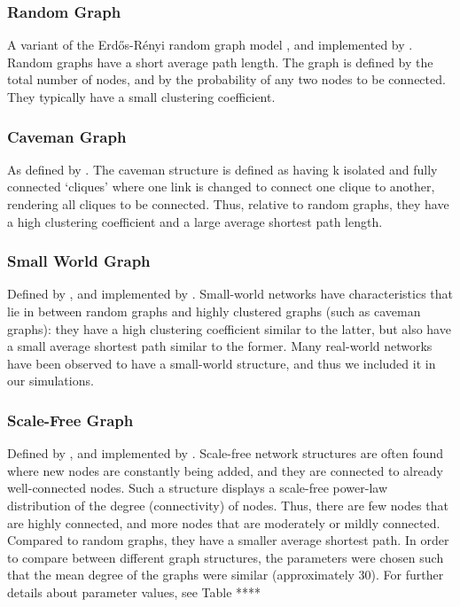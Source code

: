 \subsubsection{Random Graph}

A variant of the Erd\H{o}s-R\'enyi random graph model \citep*{ER1960}, and implemented by \citet*{BS2011}.
Random graphs have a short average path length. The graph is defined by the total number of nodes, and by the probability of any two nodes to be connected. They typically have a small clustering coefficient.

\subsubsection{Caveman Graph}

As defined by \citet*{W2003}.
The caveman structure is defined as having k isolated and fully connected `cliques' where one link is changed to connect one clique to another, rendering all cliques to be connected. Thus, relative to random graphs, they have a high clustering coefficient and a large average shortest path length.

\subsubsection{Small World Graph}

Defined by \citet*{WS1998}, and implemented by \citet*{BS2011}.
Small-world networks have characteristics that lie in between random graphs and highly clustered graphs (such as caveman graphs): they have a high clustering coefficient similar to the latter, but also have a small average shortest path similar to the former. Many real-world networks have been observed to have a small-world structure, and thus we included it in our simulations.

\subsubsection{Scale-Free Graph}

Defined by \citet*{BA1999}, and implemented by \citet*{BS2011}.
Scale-free network structures are often found where new nodes are constantly being added, and they are connected to already well-connected nodes. Such a structure displays a scale-free power-law distribution of the degree (connectivity) of nodes. Thus, there are few nodes that are highly connected, and more nodes that are moderately or mildly connected. Compared to random graphs, they have a smaller average shortest path.
In order to compare between different graph structures, the parameters were chosen such that the mean degree of the graphs were similar (approximately 30). For further details about parameter values, see Table ****

